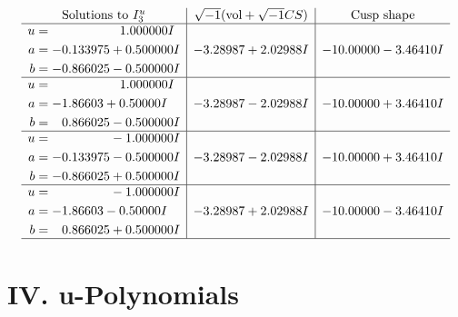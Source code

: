 \documentclass[1p]{elsarticle_modified}
\theoremstyle{definition}
\newcommand{\I}{\sqrt{-1}}
\begin{document}
$$\begin{array}{c|c|c}  
\text{Solutions to }I^u_{3}& \I (\text{vol} + \sqrt{-1}CS) & \text{Cusp shape}\\
 \hline 
\begin{aligned}
u &= \phantom{-0.000000 -}1.000000 I \\
a &= -0.133975 + 0.500000 I \\
b &= -0.866025 - 0.500000 I\end{aligned}
 & -3.28987 + 2.02988 I & -10.00000 - 3.46410 I \\ \hline\begin{aligned}
u &= \phantom{-0.000000 -}1.000000 I \\
a &= -1.86603 + 0.50000 I \\
b &= \phantom{-}0.866025 - 0.500000 I\end{aligned}
 & -3.28987 - 2.02988 I & -10.00000 + 3.46410 I \\ \hline\begin{aligned}
u &= \phantom{-0.000000 } -1.000000 I \\
a &= -0.133975 - 0.500000 I \\
b &= -0.866025 + 0.500000 I\end{aligned}
 & -3.28987 - 2.02988 I & -10.00000 + 3.46410 I \\ \hline\begin{aligned}
u &= \phantom{-0.000000 } -1.000000 I \\
a &= -1.86603 - 0.50000 I \\
b &= \phantom{-}0.866025 + 0.500000 I\end{aligned}
 & -3.28987 + 2.02988 I & -10.00000 - 3.46410 I\\
 \hline 
 \end{array}$$\newpage
\newpage\renewcommand{\arraystretch}{1}
\centering \section*{ IV. u-Polynomials}
\end{document}
